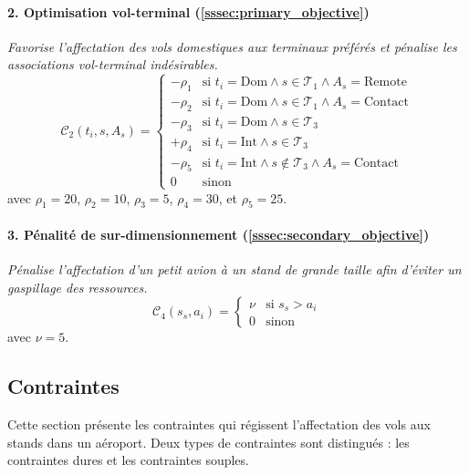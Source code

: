 \paragraph{2. Optimisation vol-terminal (\ref{sssec:primary_objective})}  
\textit{Favorise l’affectation des vols domestiques aux terminaux préférés et pénalise les associations vol-terminal indésirables.}
	\vspace{-0.7em}
\begin{equation}
	\mathcal{C}_2(t_i, s, A_s) = 
	\begin{cases}
		-\rho_1 & \text{si } t_i = \text{Dom} \land s \in \mathcal{T}_1 \land A_s = \text{Remote} \\
		-\rho_2 & \text{si } t_i = \text{Dom} \land s \in \mathcal{T}_1 \land A_s = \text{Contact} \\
		-\rho_3 & \text{si } t_i = \text{Dom} \land s \in \mathcal{T}_3 \\
		+\rho_4 & \text{si } t_i = \text{Int} \land s \in \mathcal{T}_3 \\
		-\rho_5 & \text{si } t_i = \text{Int} \land s \notin \mathcal{T}_3 \land A_s = \text{Contact} \\
		0 & \text{sinon}
	\end{cases}
\end{equation}
avec $\rho_1 = 20$, $\rho_2 = 10$, $\rho_3 = 5$, $\rho_4 = 30$, et $\rho_5 = 25$.

\paragraph{3. Pénalité de sur-dimensionnement (\ref{sssec:secondary_objective})}  
\textit{Pénalise l’affectation d’un petit avion à un stand de grande taille afin d’éviter un gaspillage des ressources.}
	\vspace{-0.7em}
\begin{equation}
	\mathcal{C}_4(s_s, a_i) = 
	\begin{cases}
		\nu & \text{si } s_s > a_i \\
		0 & \text{sinon}
	\end{cases}
\end{equation}
		\vspace{-0.7em}     
avec $\nu = 5$.
		\vspace{-1em}     
\subsection{Contraintes}

Cette section présente les contraintes qui régissent l’affectation des vols aux stands dans un aéroport. Deux types de contraintes sont distingués : les contraintes dures et les contraintes souples.

